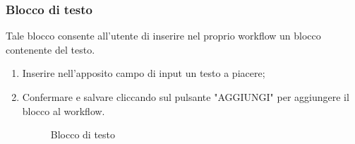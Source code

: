 \subsubsection{Blocco di testo}
Tale blocco consente all'utente di inserire nel proprio workflow un blocco contenente del testo.
\begin{enumerate}
	\item Inserire nell'apposito campo di input un testo a piacere;
	\item Confermare e salvare cliccando sul pulsante "AGGIUNGI" per aggiungere il blocco al workflow.
	\begin{figure}[!ht]
		\centering
		\caption{Blocco di testo}
	\end{figure}
\end{enumerate}

